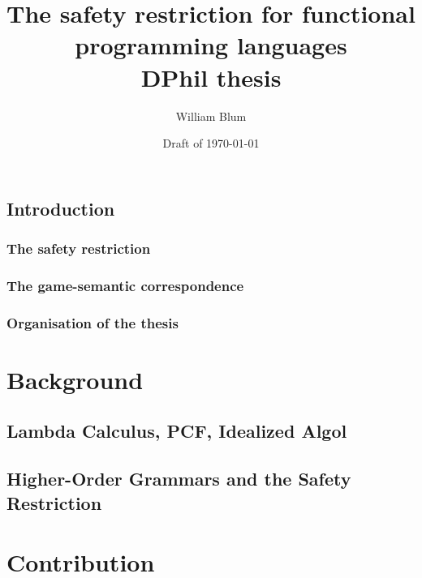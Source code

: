 
 
 


\author{William Blum}
\title{The safety restriction for functional programming languages\\{\small DPhil thesis}}
\date{Draft of \today}


\maketitle \tableofcontents


\chapter{Introduction}
    \section{The safety restriction}
    \section{The game-semantic correspondence}
    \section{Organisation of the thesis}

\part{Background}
    \chapter{Lambda Calculus, PCF, Idealized Algol}
    
    \chapter{Higher-Order Grammars and the Safety Restriction}

\part{Contribution}

